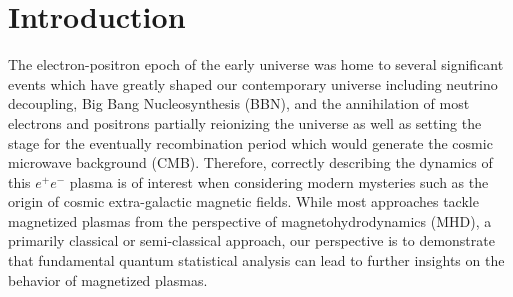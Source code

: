 \documentclass[Universe,article,submit,moreauthors,pdftex]{Definitions/mdpi}
\begin{document}
\section{Introduction}
\noindent The electron-positron epoch of the early universe was home to several significant events which have greatly shaped our contemporary universe including neutrino decoupling, Big Bang Nucleosynthesis (BBN), and the annihilation of most electrons and positrons partially reionizing the universe as well as setting the stage for the eventually recombination period which would generate the cosmic microwave background (CMB). Therefore, correctly describing the dynamics of this $e^{+}e^{-}$ plasma is of interest when considering modern mysteries such as the origin of cosmic extra-galactic magnetic fields. While most approaches tackle magnetized plasmas from the perspective of magnetohydrodynamics (MHD), a primarily classical or semi-classical approach, our perspective is to demonstrate that fundamental quantum statistical analysis can lead to further insights on the behavior of magnetized plasmas.
\end{document}
